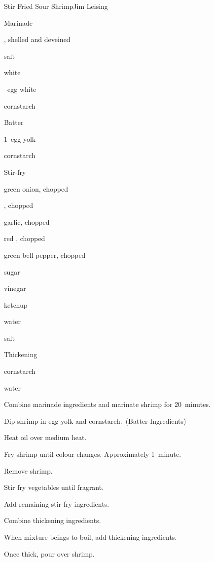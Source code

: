 \begin{recipe}{Stir Fried Sour Shrimp}{Jim Leising}{}

Marinade
\begin{ingredients}
\item \lbs{\twothird} , shelled and deveined
\item \tp{\quarter} salt
\item \tp{\half} white 
\item \half~egg white
\item {} cornstarch
\end{ingredients}

Batter
\begin{ingredients}
\item 1~egg yolk
\item \Tp{1\half} cornstarch
\end{ingredients}

Stir-fry
\begin{ingredients}
\item \Tp{\half} green onion, chopped
\item \Tp{\half} , chopped
\item \Tp{\half} garlic, chopped
\item \Tp{\half} red , chopped
\item {} green bell pepper, chopped
\item {} sugar
\item {} vinegar
\item {} ketchup
\item {} water
\item \tp{\quarter} salt
\end{ingredients}

Thickening
\begin{ingredients}
\item \tp{\half} cornstarch
\item \Tp{\half} water
\end{ingredients}

\begin{directions}
\item Combine marinade ingredients and marinate shrimp for 20~minutes.
\item Dip shrimp in egg yolk and cornstarch.~(Batter Ingredients)
\item Heat oil over medium heat.
\item Fry shrimp until colour changes. Approximately 1~minute.
\item Remove shrimp.
\item Stir fry vegetables until fragrant.
\item Add remaining stir-fry ingredients.
\item Combine thickening ingredients.
\item When mixture beings to boil, add thickening ingredients.
\item Once thick, pour over shrimp.
\end{directions}

\end{recipe}
